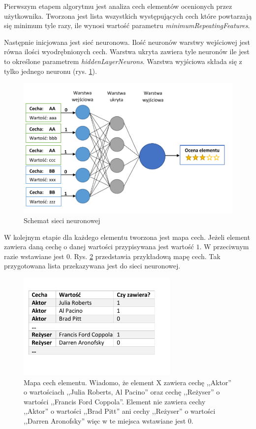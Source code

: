\documentclass[twoside]{iisthesis}
\begin{document}
		 Pierwszym etapem algorytmu jest analiza cech elementów ocenionych przez użytkownika. Tworzona jest lista wszystkich występujących cech które powtarzają się minimum tyle razy, ile wynosi wartość  parametru \textit{minimumRepeatingFeatures}. 
		 
		 Następnie inicjowana jest sieć neuronowa. Ilość neuronów warstwy wejściowej jest równa ilości wyodrębnionych cech. Warstwa ukryta zawiera tyle neuronów ile jest to określone parametrem \textit{hiddenLayerNeurons}. Warstwa wyjściowa składa się z tylko jednego neuronu (rys. \ref{fig:siecneuronowa}). 
		 
		 \begin{figure}%
		 	\centering
		 	\includegraphics[width=1\textwidth]{siecneuronowa}
		 	\caption{Schemat sieci neuronowej}
		 	\label{fig:siecneuronowa}
		 \end{figure}
		 
		 W kolejnym etapie dla każdego elementu tworzona jest mapa cech. Jeżeli element zawiera daną cechę o danej wartości przypisywana jest wartość $1$. W przeciwnym razie wstawiane jest $0$. Rys. \ref{fig:mapacech} przedstawia przykładową mapę cech. Tak przygotowana lista przekazywana jest do sieci neuronowej. 
		 
		 \begin{figure}%
		 	\centering
		 	\includegraphics[width=0.7\textwidth]{mapacech}
		 	\caption{Mapa cech elementu. Wiadomo, że element X zawiera cechę ,,Aktor'' o wartościach ,,Julia Roberts, Al Pacino'' oraz cechę ,,Reżyser'' o wartości ,,Francis Ford Coppola''. Element nie zawiera cechy ,,Aktor'' o wartości ,,Brad Pitt'' ani cechy ,,Reżyser'' o wartości ,,Darren Aronofsky'' więc w te miejsca wstawiane jest $0$.}
		 	\label{fig:mapacech}
		 \end{figure}
		 
\end{document}

